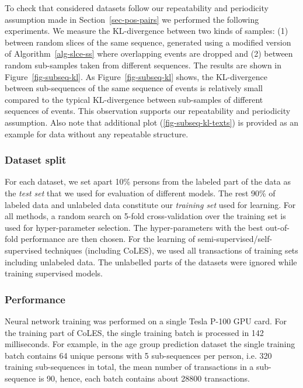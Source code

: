 \documentclass[sigconf, anonymous]{acmart}
\begin{document}
To check that considered datasets follow our repeatability and periodicity assumption made in Section~\ref{sec-pos-pairs}
we performed the following experiments. We measure the KL-divergence between two kinds of samples: (1) between random slices of the same sequence, generated using a modified version of Algorithm~\ref{alg-slce-ss} where overlapping events are dropped and (2) between random sub-samples taken from different sequences. The results are shown in Figure~\ref{fig-subseq-kl}. As Figure~\ref{fig-subseq-kl} shows, the KL-divergence between sub-sequences of the same sequence of events is relatively small compared to the typical KL-divergence between sub-samples of different sequences of events. This observation supports our repeatability and periodicity assumption.
Also note that additional plot (\ref{fig-subseq-kl-texts}) is provided as an example for data without any repeatable structure.

\subsubsection{Dataset split}

For each dataset, we set apart 10\% persons from the labeled part of the data as the \textit{test set} that we used for evaluation of different models. The rest 90\% of labeled data and unlabeled data constitute our \textit{training set} used for learning. For all methods, a random search on 5-fold cross-validation over the training set is used for hyper-parameter selection. The hyper-parameters with the best out-of-fold performance are then chosen.
For the learning of semi-supervised/self-supervised techniques (including CoLES), we used all transactions of training sets including unlabeled data. The unlabelled parts of the datasets were ignored while training supervised models.

\subsubsection{Performance}

Neural network training was performed on a single Tesla P-100 GPU card. For the training part of CoLES, the single training batch is processed in 142 milliseconds. For example, in the age group prediction dataset the single training batch contains 64 unique persons with 5 sub-sequences per person, i.e. 320 training sub-sequences in total, the mean number of transactions in a sub-sequence is 90, hence, each batch contains about 28800 transactions.
\end{document}
